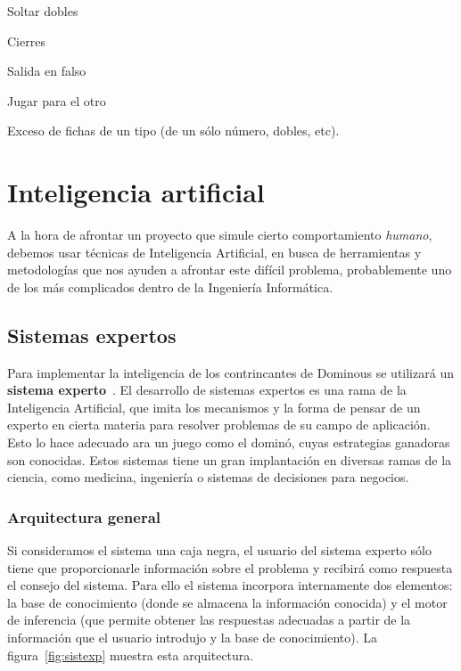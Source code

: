 
Soltar dobles

Cierres

Salida en falso

Jugar para el otro

Exceso de fichas de un tipo (de un sólo número, dobles, etc).


\section{Inteligencia artificial}

A la hora de afrontar un proyecto que simule cierto comportamiento \emph{humano}, debemos usar técnicas de Inteligencia Artificial, en busca de herramientas y metodologías que nos ayuden a afrontar este difícil problema, probablemente uno de los más complicados dentro de la Ingeniería Informática. 

\subsection{Sistemas expertos}

Para implementar la inteligencia de los contrincantes de Dominous se utilizará un
\textbf{sistema experto}~\cite{Giarratano:1989:ESP:583478}.
El desarrollo de sistemas expertos es una rama de la Inteligencia Artificial, que imita los mecanismos y la forma de
pensar de un experto en cierta materia para resolver problemas de su campo de aplicación. Esto lo hace adecuado ara un juego como el dominó, cuyas estrategias ganadoras son conocidas. Estos sistemas tiene un gran implantación en diversas ramas de la ciencia, como medicina, ingeniería o sistemas de decisiones para negocios.\\

\subsubsection{Arquitectura general}

Si consideramos el sistema una caja negra, el usuario del sistema experto sólo tiene que proporcionarle información sobre el problema y recibirá como respuesta el consejo del sistema. Para ello el sistema incorpora internamente dos elementos: la base de conocimiento (donde se almacena la información conocida) y el motor de inferencia (que permite obtener las respuestas adecuadas a partir de la información que el usuario introdujo y la base de conocimiento). La figura~\ref{fig:sistexp} muestra esta arquitectura. \\

